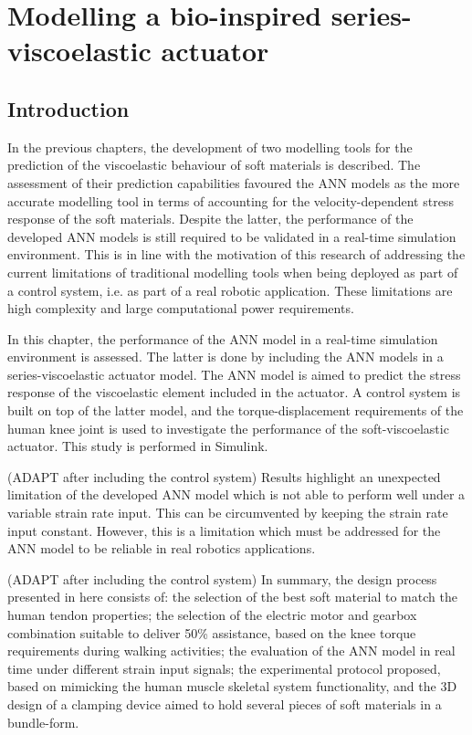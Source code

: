 \chapter{Modelling a bio-inspired series-viscoelastic actuator} \label{ch7:ModelingBio}

\section{Introduction}

In the previous chapters, the development of two modelling tools for the prediction of the viscoelastic behaviour of soft materials is described. The assessment of their prediction capabilities favoured the ANN models as the more accurate modelling tool in terms of accounting for the velocity-dependent stress response of the soft materials. Despite the latter, the performance of the developed ANN models is still required to be validated in a real-time simulation environment. This is in line with the motivation of this research of addressing the current limitations of traditional modelling tools when being deployed as part of a control system, i.e. as part of a real robotic application. These limitations are high complexity and large computational power requirements.

In this chapter, the performance of the ANN model in a real-time simulation environment is assessed. The latter is done by including the ANN models in a series-viscoelastic actuator model. The ANN model is aimed to predict the stress response of the viscoelastic element included in the actuator. A control system is built on top of the latter model, and the torque-displacement requirements of the human knee joint is used to investigate the performance of the soft-viscoelastic actuator. This study is performed in Simulink.  

(ADAPT after including the control system) Results highlight an unexpected limitation of the developed ANN model which is not able to perform well under a variable strain rate input. This can be circumvented by keeping the strain rate input constant. However, this is a limitation which must be addressed for the ANN model to be reliable in real robotics applications.

(ADAPT after including the control system) In summary, the design process presented in here consists of: the selection of the best soft material to match the human tendon properties; the selection of the electric motor and gearbox combination suitable to deliver 50\% assistance, based on the knee torque requirements during walking activities; the evaluation of the ANN model in real time under different strain input signals; the experimental protocol proposed, based on mimicking the human muscle skeletal system functionality, and the 3D design of a clamping device aimed to hold several pieces of soft materials in a bundle-form.

